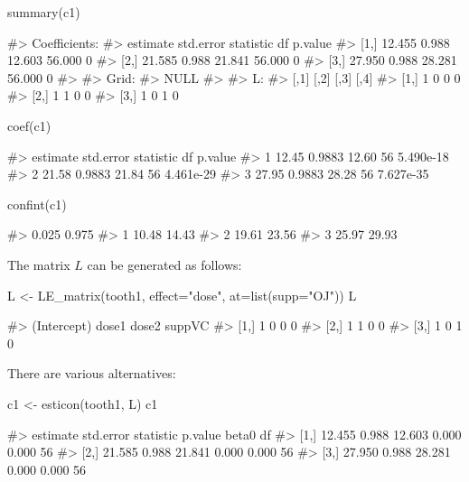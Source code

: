 \begin{Schunk}
\begin{Sinput}
summary(c1)
\end{Sinput}
\begin{Soutput}
#> Coefficients:
#>      estimate std.error statistic     df p.value
#> [1,]   12.455     0.988    12.603 56.000       0
#> [2,]   21.585     0.988    21.841 56.000       0
#> [3,]   27.950     0.988    28.281 56.000       0
#> 
#> Grid:
#> NULL
#> 
#> L:
#>      [,1] [,2] [,3] [,4]
#> [1,]    1    0    0    0
#> [2,]    1    1    0    0
#> [3,]    1    0    1    0
\end{Soutput}
\begin{Sinput}
coef(c1)
\end{Sinput}
\begin{Soutput}
#>   estimate std.error statistic df   p.value
#> 1    12.45    0.9883     12.60 56 5.490e-18
#> 2    21.58    0.9883     21.84 56 4.461e-29
#> 3    27.95    0.9883     28.28 56 7.627e-35
\end{Soutput}
\begin{Sinput}
confint(c1)
\end{Sinput}
\begin{Soutput}
#>   0.025 0.975
#> 1 10.48 14.43
#> 2 19.61 23.56
#> 3 25.97 29.93
\end{Soutput}
\end{Schunk}

The matrix \(L\) can be generated as follows:

\begin{Schunk}
\begin{Sinput}
L <- LE_matrix(tooth1, effect="dose", at=list(supp="OJ"))
L
\end{Sinput}
\begin{Soutput}
#>      (Intercept) dose1 dose2 suppVC
#> [1,]           1     0     0      0
#> [2,]           1     1     0      0
#> [3,]           1     0     1      0
\end{Soutput}
\end{Schunk}

There are various alternatives:

\begin{Schunk}
\begin{Sinput}
c1 <- esticon(tooth1, L)
c1
\end{Sinput}
\begin{Soutput}
#>      estimate std.error statistic p.value  beta0 df
#> [1,]   12.455     0.988    12.603   0.000  0.000 56
#> [2,]   21.585     0.988    21.841   0.000  0.000 56
#> [3,]   27.950     0.988    28.281   0.000  0.000 56
\end{Soutput}
\end{Schunk}

